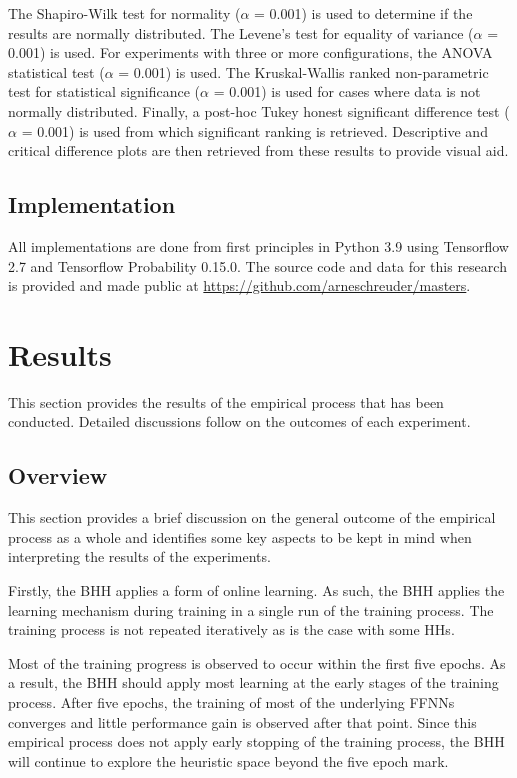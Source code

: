 \documentclass[preprint,review,12pt]{elsarticle}
\begin{document}
The Shapiro-Wilk test for normality ($\alpha$ = 0.001) is used to determine if the results are normally distributed. The Levene's test for equality of variance ($\alpha$ = 0.001) is used. For experiments with three or more configurations, the \acs{ANOVA} statistical test ($\alpha$ = 0.001) is used. The Kruskal-Wallis ranked non-parametric test for statistical significance ($\alpha$ = 0.001) is used for cases where data is not normally distributed. Finally, a post-hoc Tukey honest significant difference test ($\alpha$ = 0.001) is used from which significant ranking is retrieved. Descriptive and critical difference plots are then retrieved from these results to provide visual aid.

\subsection{Implementation}\label{sec:methodology:implementation}

All implementations are done from first principles in Python 3.9 using Tensorflow 2.7 and Tensorflow Probability 0.15.0. The source code and data for this research is provided and made public at \url{https://github.com/arneschreuder/masters}.



\section{Results}
\label{sec:results}

This section provides the results of the empirical process that has been conducted. Detailed discussions follow on the outcomes of each experiment.

\subsection{Overview}\label{sec:results:overview}

This section provides a brief discussion on the general outcome of the empirical process as a whole and identifies some key aspects to be kept in mind when interpreting the results of the experiments.

Firstly, the \acs{BHH} applies a form of online learning. As such, the \acs{BHH} applies the learning mechanism during training in a single run of the training process. The training process is not repeated iteratively as is the case with some \acp{HH}.

Most of the training progress is observed to occur within the first five epochs. As a result, the \acs{BHH} should apply most learning at the early stages of the training process. After five epochs, the training of most of the underlying \acp{FFNN} converges and little performance gain is observed after that point. Since this empirical process does not apply early stopping of the training process, the \acs{BHH} will continue to explore the heuristic space beyond the five epoch mark.
\end{document}
